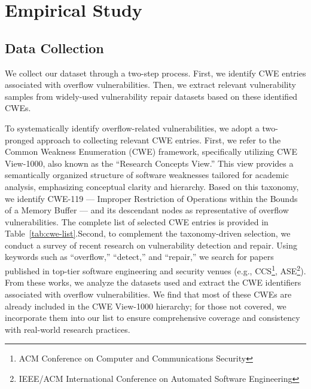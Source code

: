 
\section{Empirical Study}\label{motivation}
 

\subsection{Data Collection}
We collect our dataset through a two-step process. First, we identify CWE entries associated with overflow vulnerabilities. Then, we extract relevant vulnerability samples from widely-used vulnerability repair datasets based on these identified CWEs.

\sloppy
To systematically identify overflow-related vulnerabilities, we adopt a two-pronged approach to collecting relevant CWE entries. First, we refer to the Common Weakness Enumeration (CWE) framework\cite{CWEHome}, specifically utilizing CWE View-1000\cite{CWE1000}, also known as the “Research Concepts View.” This view provides a semantically organized structure of software weaknesses tailored for academic analysis, emphasizing conceptual clarity and hierarchy. Based on this taxonomy, we identify CWE-119 — Improper Restriction of Operations within the Bounds of a Memory Buffer — and its descendant nodes as representative of overflow vulnerabilities. The complete list of selected CWE entries is provided in Table~\ref{tab:cwe-list}.Second, to complement the taxonomy-driven selection, we conduct a survey of recent research on vulnerability detection and repair. Using keywords such as “overflow,” “detect,” and “repair,” we search for papers published in top-tier software engineering and security venues (e.g., CCS\footnote{ACM Conference on Computer and Communications Security}, ASE\footnote{IEEE/ACM International Conference on Automated Software Engineering}). From these works\cite{le2024study,li2022pacmem,liu2025cctag,zhang2023vulnerability,kang2022tracer,gorter2024sticky,steenhoek2023empirical,ba2022efficient,guo2024precise}, we analyze the datasets used and extract the CWE identifiers associated with overflow vulnerabilities. We find that most of these CWEs are already included in the CWE View-1000 hierarchy; for those not covered, we incorporate them into our list to ensure comprehensive coverage and consistency with real-world research practices.

